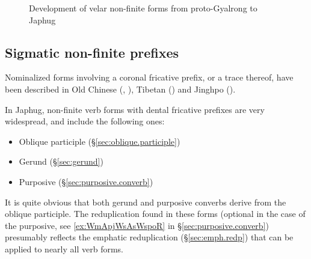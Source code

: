    \begin{figure}[H]
   \caption{Development of velar non-finite forms from proto-Gyalrong to Japhug} \label{fig:velar.nmlz.history}  
\end{figure}


\subsection{Sigmatic non-finite prefixes} \label{sec:sigmatic.nmlz.history}
Nominalized forms involving a coronal fricative prefix, or a trace thereof, have been described in Old Chinese (\citealt[73]{sagart99roc}, \citealt[56]{bs14oc}), Tibetan (\citealt{jacques18oc-nmlz}) and Jinghpo (\citealt[3--4]{dai92yufa}). 


In Japhug, non-finite verb forms with dental fricative prefixes are very widespread, and include the following ones:

\begin{itemize}
\item Oblique participle (§\ref{sec:oblique.participle})
\item Gerund (§\ref{sec:gerund})
\item Purposive (§\ref{sec:purposive.converb})
\end{itemize}

It is quite obvious that both gerund and purposive converbs derive from the oblique participle. The reduplication found in these forms (optional in the case of the purposive, see \ref{ex:WmApjWsAsWspoR} in §\ref{sec:purposive.converb}) presumably reflects the emphatic reduplication (§\ref{sec:emph.redp}) that can be applied to nearly all verb forms.



